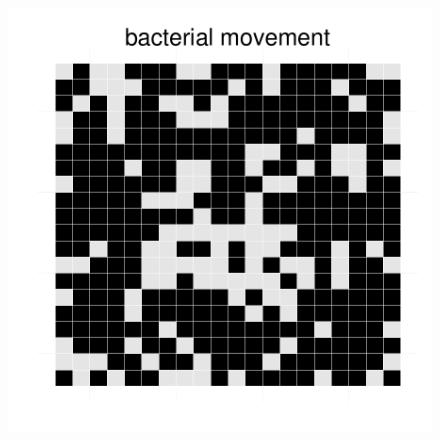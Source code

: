 \begin{figure}[h!]
{\begin{minipage}[t]{0.3\textwidth}
  \end{minipage}
  \begin{minipage}[t]{0.3\textwidth}
    \includegraphics[width=\textwidth]{../results/Bcoli_20x20_seed176_bac35.pdf}
  \end{minipage}
  }
\end{figure}
